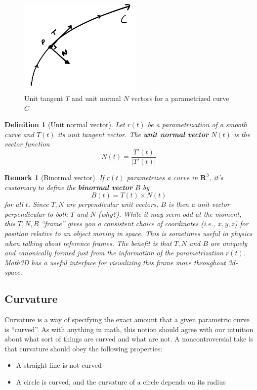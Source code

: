 \documentclass[12pt]{article}
\numberwithin{equation}{subsection}
\numberwithin{figure}{subsection}
\newtheorem{defn}[subsection]{Definition}
\theoremstyle{note}
\newtheorem{remark}[subsection]{Remark}
\begin{document}
{\begin{figure}[h!]
\centering
 \includegraphics[width=60mm]{Images/curve-TN}
 \caption{Unit tangent $T$ and unit normal $N$ vectors for a parametrized curve $C$} 
 \end{figure}
 
\begin{defn}[Unit normal vector] Let $r(t)$ be a parametrization of a smooth curve and $T(t)$ its unit tangent vector. The \textbf{unit normal vector} $N(t)$ is the vector function \begin{equation} \label{unit-normal} N(t)=\dfrac{T'(t)}{|T'(t)|} \end{equation}
\end{defn}


\begin{remark}[Binormal vector]If $r(t)$ parametrizes a curve in $\mathbf{R}^3$, it's customary to define the \textbf{binormal vector} $B$ by  \begin{equation} 
	B(t)=T(t)\times N(t)
\end{equation} for all $t$. Since $T,N$ are perpendicular unit vectors, $B$ is then a unit vector perpendicular to both $T$ and $N$ (why?). While it may seem odd at the moment, this $T,N, B$ ``frame'' gives you a consistent choice of coordinates (i.e., $x,y,z$) for position \textit{relative} to an object moving in space. This is sometimes useful in physics when talking about reference frames. The benefit is that $T,N$ and $B$ are uniquely and canonically formed just from the information of the parametrization $r(t)$. Math3D has a \href{https://www.math3d.org/tnb}{useful interface} for visualizing this frame move throughout 3d-space. 
\end{remark}

\subsection{Curvature} Curvature is a way of specifying the exact amount that a given parametric curve is ``curved''. As with anything in math, this notion should agree with our intuition about what sort of things are curved and what are not. A noncontroversial take is that curvature should obey the following properties: 
\begin{itemize}
	\item A straight line is not curved
	\item A circle is curved, and the curvature of a circle depends on its radius 
\end{itemize}



}
\end{document}
